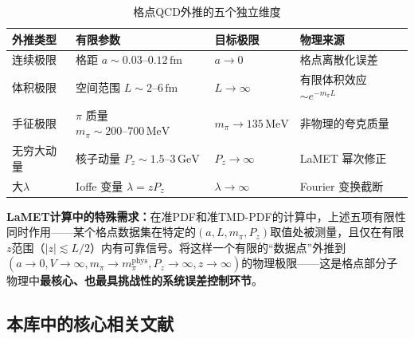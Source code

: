 \documentclass[12pt,a4paper]{ctexart}
\theoremstyle{definition}
\newcommand{\fm}{\,\mathrm{fm}}
\newcommand{\GeV}{\,\mathrm{GeV}}
\newcommand{\MeV}{\,\mathrm{MeV}}
\begin{document}
\begin{table}[H]
\centering
\caption{格点QCD外推的五个独立维度}
\label{tab:five_extrap}
\begin{tabular}{p{2cm}p{3.5cm}p{3cm}p{4cm}}
\toprule
\textbf{外推类型} & \textbf{有限参数} & \textbf{目标极限} & \textbf{物理来源} \\
\midrule
连续极限 & 格距 $a \sim 0.03\text{--}0.12\fm$ & $a \to 0$ & 格点离散化误差 \\
体积极限 & 空间范围 $L \sim 2\text{--}6\fm$ & $L \to \infty$ & 有限体积效应 $\sim e^{-m_\pi L}$ \\
手征极限 & $\pi$ 质量 $m_\pi \sim 200\text{--}700\MeV$ & $m_\pi \to 135\MeV$ & 非物理的夸克质量 \\
无穷大动量 & 核子动量 $P_z \sim 1.5\text{--}3\GeV$ & $P_z \to \infty$ & LaMET 幂次修正 \\
大$\lambda$ & Ioffe 变量 $\lambda = zP_z$ & $\lambda \to \infty$ & Fourier 变换截断 \\
\bottomrule
\end{tabular}
\end{table}

\textbf{LaMET计算中的特殊需求：}在准PDF和准TMD-PDF的计算中，上述五项有限性同时作用——某个格点数据集在特定的$(a, L, m_\pi, P_z)$取值处被测量，且仅在有限$z$范围（$|z| \lesssim L/2$）内有可靠信号。将这样一个有限的``数据点''外推到$(a\to0, V\to\infty, m_\pi\to m_\pi^{\text{phys}}, P_z\to\infty, z\to\infty)$的物理极限——这是格点部分子物理中\textbf{最核心、也最具挑战性的系统误差控制环节}。

\subsection{本库中的核心相关文献}
\end{document}
